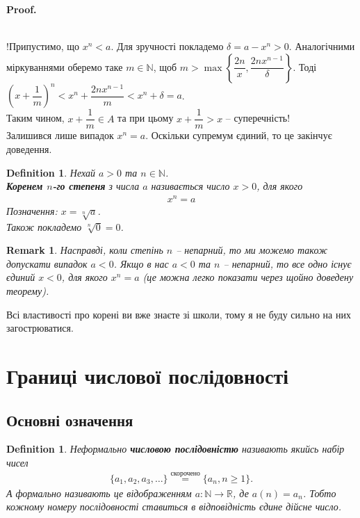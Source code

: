 \documentclass[a4paper, 14pt]{article}
\makeatletter
\def\qed{$\blacksquare$}
\theoremstyle{theoremdd}
\theoremstyle{theoremdd}
\newtheorem{definition}[theorem]{Definition}
\theoremstyle{theoremdd}
\theoremstyle{theoremdd}
\theoremstyle{theoremdd}
\theoremstyle{theoremdd}
\newtheorem{remark}[theorem]{Remark}
\theoremstyle{theoremdd}
\theoremstyle{theoremdd}
\renewenvironment{proof}[1][Proof.\\]{\par
\pushQED{\hfill \qed}%
\normalfont \topsep6\p@\@plus6\p@\relax
\trivlist
\item\relax
{\bfseries
#1\@addpunct{.}}\hspace\labelsep\ignorespaces
}{%
\popQED\endtrivlist\@endpefalse
}
\makeatother
\begin{document}
\begin{proof}
	\bigskip \\
	!Припустимо, що $x^n < a$. Для зручності покладемо $\delta = a - x^n > 0$. Аналогічними міркуваннями оберемо таке $m \in \mathbb{N}$, щоб $m > \max\left\{ \dfrac{2n}{x}, \dfrac{2nx^{n-1}}{\delta} \right\}$. Тоді\\
	$\left( x + \dfrac{1}{m} \right)^n < x^n + \dfrac{2nx^{n-1}}{m} < x^n + \delta = a$.\\
	Таким чином, $x + \dfrac{1}{m} \in A$ та при цьому $x + \dfrac{1}{m} > x$ -- суперечність!
	\bigskip \\
	Залишився лише випадок $x^n = a$. Оскільки супремум єдиний, то це закінчує доведення.
	\end{proof}
	
	\begin{definition}
	Нехай $a > 0$ та $n \in \mathbb{N}$.\\
	\textbf{Коренем $n$-го степеня} з числа $a$ називається число $x > 0$, для якого
	\begin{align*}
	x^n = a
	\end{align*}
	Позначення: $x = \sqrt[n]{a}$.\\
	Також покладемо $\sqrt[n]{0} = 0$.
	\end{definition}
	
	\begin{remark}
	Насправді, коли степінь $n$ -- непарний, то ми можемо також допускати випадок $a < 0$. Якщо в нас $a < 0$ та $n$ -- непарний, то все одно існує єдиний $x < 0$, для якого $x^n = a$ (це можна легко показати через щойно доведену теорему).
	\end{remark}
	
	Всі властивості про корені ви вже знаєте зі школи, тому я не буду сильно на них загострюватися.
	\newpage
	
	\setcounter{section}{2}
	\section{Границі числової послідовності}
	\subsection{Основні означення}
	\begin{definition}
	Неформально \textbf{числовою послідовністю} називають якийсь набір чисел 
	\begin{align*}
	\{a_1,a_2,a_3, \dots\} \overset{\text{скорочено}}{=} \{a_n, n \geq 1\}.
	\end{align*}
	А формально називають це відображенням $a \colon \mathbb{N} \to \mathbb{R}$, де $a(n) = a_n$. Тобто кожному номеру послідовності ставиться в відповідність єдине дійсне число.
	\end{definition}
	
\end{document}
